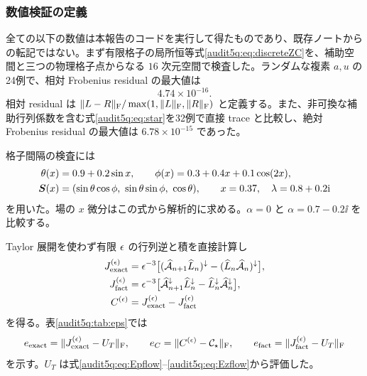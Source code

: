 \subsubsection{数値検証の定義}

全ての以下の数値は本報告のコードを実行して得たものであり、既存ノートからの転記ではない。まず有限格子の局所恒等式\eqref{audit5q:eq:discreteZC}を、補助空間と三つの物理格子点からなる $16$ 次元空間で検査した。ランダムな複素 $a,u$ の24例で、相対 Frobenius residual の最大値は
\begin{equation}
4.74\times10^{-16}.
\end{equation}
相対 residual は $\|L-R\|_{\rm F}/\max(1,\|L\|_{\rm F},\|R\|_{\rm F})$ と定義する。また、非可換な補助行列係数を含む式\eqref{audit5q:eq:star}を32例で直接 trace と比較し、絶対 Frobenius residual の最大値は $6.78\times10^{-15}$ であった。

格子間隔の検査には
\begin{align}
\theta(x)&=0.9+0.2\sin x,\qquad
\phi(x)=0.3+0.4x+0.1\cos(2x),\\
\bs(x)&=(\sin\theta\cos\phi,\ \sin\theta\sin\phi,\ \cos\theta),\qquad
x=0.37,\quad\lambda=0.8+0.2\ii
\end{align}
を用いた。場の $x$ 微分はこの式から解析的に求める。$\alpha=0$ と $\alpha=0.7-0.2\ii$ を比較する。

Taylor 展開を使わず有限 $\epsilon$ の行列逆と積を直接計算し
\begin{align}
J_{\rm exact}^{(\epsilon)}&=\epsilon^{-3}
\bigl[(\widehat{\mathcal A}_{n+1}\widehat L_n)^{\downarrow}
-(\widehat L_n\widehat{\mathcal A}_n)^{\downarrow}\bigr],\\
J_{\rm fact}^{(\epsilon)}&=\epsilon^{-3}
\bigl[\widehat{\mathcal A}_{n+1}^{\downarrow}\widehat L_n^{\downarrow}
-\widehat L_n^{\downarrow}\widehat{\mathcal A}_n^{\downarrow}\bigr],\\
C^{(\epsilon)}&=J_{\rm exact}^{(\epsilon)}-J_{\rm fact}^{(\epsilon)}
\end{align}
を得る。表\ref{audit5q:tab:eps}では
\begin{equation}
e_{\rm exact}=\|J_{\rm exact}^{(\epsilon)}-U_T\|_{\rm F},\qquad
e_C=\|C^{(\epsilon)}-\mathcal C_{\star}\|_{\rm F},\qquad
e_{\rm fact}=\|J_{\rm fact}^{(\epsilon)}-U_T\|_{\rm F}
\end{equation}
を示す。$U_T$ は式\eqref{audit5q:eq:Epflow}--\eqref{audit5q:eq:Ezflow}から評価した。

